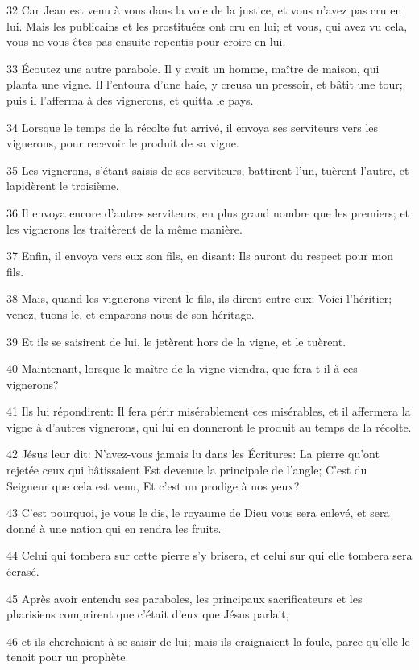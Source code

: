 \par 32 Car Jean est venu à vous dans la voie de la justice, et vous n'avez pas cru en lui. Mais les publicains et les prostituées ont cru en lui; et vous, qui avez vu cela, vous ne vous êtes pas ensuite repentis pour croire en lui.
\par 33 Écoutez une autre parabole. Il y avait un homme, maître de maison, qui planta une vigne. Il l'entoura d'une haie, y creusa un pressoir, et bâtit une tour; puis il l'afferma à des vignerons, et quitta le pays.
\par 34 Lorsque le temps de la récolte fut arrivé, il envoya ses serviteurs vers les vignerons, pour recevoir le produit de sa vigne.
\par 35 Les vignerons, s'étant saisis de ses serviteurs, battirent l'un, tuèrent l'autre, et lapidèrent le troisième.
\par 36 Il envoya encore d'autres serviteurs, en plus grand nombre que les premiers; et les vignerons les traitèrent de la même manière.
\par 37 Enfin, il envoya vers eux son fils, en disant: Ils auront du respect pour mon fils.
\par 38 Mais, quand les vignerons virent le fils, ils dirent entre eux: Voici l'héritier; venez, tuons-le, et emparons-nous de son héritage.
\par 39 Et ils se saisirent de lui, le jetèrent hors de la vigne, et le tuèrent.
\par 40 Maintenant, lorsque le maître de la vigne viendra, que fera-t-il à ces vignerons?
\par 41 Ils lui répondirent: Il fera périr misérablement ces misérables, et il affermera la vigne à d'autres vignerons, qui lui en donneront le produit au temps de la récolte.
\par 42 Jésus leur dit: N'avez-vous jamais lu dans les Écritures: La pierre qu'ont rejetée ceux qui bâtissaient Est devenue la principale de l'angle; C'est du Seigneur que cela est venu, Et c'est un prodige à nos yeux?
\par 43 C'est pourquoi, je vous le dis, le royaume de Dieu vous sera enlevé, et sera donné à une nation qui en rendra les fruits.
\par 44 Celui qui tombera sur cette pierre s'y brisera, et celui sur qui elle tombera sera écrasé.
\par 45 Après avoir entendu ses paraboles, les principaux sacrificateurs et les pharisiens comprirent que c'était d'eux que Jésus parlait,
\par 46 et ils cherchaient à se saisir de lui; mais ils craignaient la foule, parce qu'elle le tenait pour un prophète.


